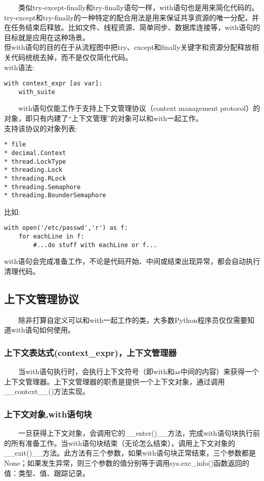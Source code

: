 \documentclass[11pt,a4paper]{article}
\begin{document}
\begin{CJK*}{UTF8}{nsung}
~~~~类似try-except-finally和try-finally语句一样，with语句也是用来简化代码的。try-except和try-finally的一种特定的配合用法是用来保证共享资源的唯一分配，并在任务结束后释放。比如文件、线程资源、简单同步、数据库连接等，with语句的目标就是应用在这种场景。\\

但with语句的目的在于从流程图中把try、except和finally关键字和资源分配释放相关代码统统去掉，而不是仅仅简化代码。\\
with语法:
\begin{verbatim}
with context_expr [as var]:
    with_suite
\end{verbatim}
~~~~with语句仅能工作于支持上下文管理协议（context management protocol）的对象，即只有内建了“上下文管理”的对象可以和with一起工作。\\
支持该协议的对象列表:
\begin{verbatim}
* file
* decimal.Context
* thread.LockType
* threading.Lock
* threading.RLock
* threading.Semaphore
* threading.BounderSemaphore
\end{verbatim}
比如:
\begin{verbatim}
with open('/etc/passwd','r') as f:
    for eachLine in f:
        #...do stuff with eachLine or f...
\end{verbatim}
with语句会完成准备工作，不论是代码开始、中间或结束出现异常，都会自动执行清理代码。

\subsection{上下文管理协议}

~~~~除非打算自定义可以和with一起工作的类，大多数Python程序员仅仅需要知道with语句如何使用。
\subsubsection{上下文表达式(context\_expr)，上下文管理器}

~~~~当with语句执行时，会执行上下文符号（即with和as中间的内容）来获得一个上下文管理器。上下文管理器的职责是提供一个上下文对象，通过调用\_\_context\_\_()方法实现。
\subsubsection{上下文对象,with语句块}

~~~~一旦获得上下文对象，会调用它的\_\_enter()\_\_方法，完成with语句块执行前的所有准备工作。当with语句块结束（无论怎么结束），调用上下文对象的\_\_exit()\_\_方法。此方法有三个参数，如果with语句块正常结束，三个参数都是None；如果发生异常，则三个参数的值分别等于调用sys.exc\_info()函数返回的值：类型、值、跟踪记录。





\end{CJK*}
\end{document}
